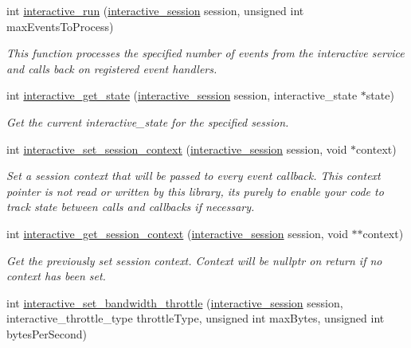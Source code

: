 \begin{DoxyCompactItemize}
int \mbox{\hyperlink{group___interactivity_ga88cca1c7bc083ce5eb171d750f284342}{interactive\+\_\+run}} (\mbox{\hyperlink{group___interactivity_ga6d8819d38b8dc8994a2299cf22a65a31}{interactive\+\_\+session}} session, unsigned int max\+Events\+To\+Process)
\begin{DoxyCompactList}\small\item\em This function processes the specified number of events from the interactive service and calls back on registered event handlers. \end{DoxyCompactList}\item 
int \mbox{\hyperlink{group___interactivity_ga9ac2284b559712581d921ff437cd0a02}{interactive\+\_\+get\+\_\+state}} (\mbox{\hyperlink{group___interactivity_ga6d8819d38b8dc8994a2299cf22a65a31}{interactive\+\_\+session}} session, interactive\+\_\+state $\ast$state)
\begin{DoxyCompactList}\small\item\em Get the current {\ttfamily interactive\+\_\+state} for the specified session. \end{DoxyCompactList}\item 
int \mbox{\hyperlink{group___interactivity_ga1c988b20ef84417816c0f9ba05c1c41c}{interactive\+\_\+set\+\_\+session\+\_\+context}} (\mbox{\hyperlink{group___interactivity_ga6d8819d38b8dc8994a2299cf22a65a31}{interactive\+\_\+session}} session, void $\ast$context)
\begin{DoxyCompactList}\small\item\em Set a session context that will be passed to every event callback. This context pointer is not read or written by this library, it\textquotesingle{}s purely to enable your code to track state between calls and callbacks if necessary. \end{DoxyCompactList}\item 
int \mbox{\hyperlink{group___interactivity_ga915381698928c8d42e21874b5358f5b1}{interactive\+\_\+get\+\_\+session\+\_\+context}} (\mbox{\hyperlink{group___interactivity_ga6d8819d38b8dc8994a2299cf22a65a31}{interactive\+\_\+session}} session, void $\ast$$\ast$context)
\begin{DoxyCompactList}\small\item\em Get the previously set session context. Context will be nullptr on return if no context has been set. \end{DoxyCompactList}\item 
int \mbox{\hyperlink{group___interactivity_gabbc2397a492c987161be8fd99fc7421b}{interactive\+\_\+set\+\_\+bandwidth\+\_\+throttle}} (\mbox{\hyperlink{group___interactivity_ga6d8819d38b8dc8994a2299cf22a65a31}{interactive\+\_\+session}} session, interactive\+\_\+throttle\+\_\+type throttle\+Type, unsigned int max\+Bytes, unsigned int bytes\+Per\+Second)
$$
\end{DoxyCompactItemize}
